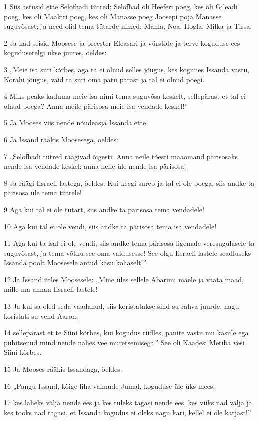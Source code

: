 \par 1 Siis astusid ette Selofhadi tütred; Selofhad oli Heeferi poeg, kes oli Gileadi poeg, kes oli Maakiri poeg, kes oli Manasse poeg Joosepi poja Manasse suguvõsast; ja need olid tema tütarde nimed: Mahla, Noa, Hogla, Milka ja Tirsa.
\par 2 Ja nad seisid Moosese ja preester Eleasari ja vürstide ja terve koguduse ees kogudusetelgi ukse juures, öeldes:
\par 3 „Meie isa suri kõrbes, aga ta ei olnud selles jõugus, kes kogunes Issanda vastu, Korahi jõugus, vaid ta suri oma patu pärast ja tal ei olnud poegi.
\par 4 Miks peaks kaduma meie isa nimi tema suguvõsa keskelt, sellepärast et tal ei olnud poega? Anna meile pärisosa meie isa vendade keskel!”
\par 5 Ja Mooses viis nende nõudeasja Issanda ette.
\par 6 Ja Issand rääkis Moosesega, öeldes:
\par 7 „Selofhadi tütred räägivad õigesti. Anna neile tõesti maaomand pärisosaks nende isa vendade keskel; anna neile üle nende isa pärisosa!
\par 8 Ja räägi Iisraeli lastega, öeldes: Kui keegi sureb ja tal ei ole poega, siis andke ta pärisosa üle tema tütrele!
\par 9 Aga kui tal ei ole tütart, siis andke ta pärisosa tema vendadele!
\par 10 Aga kui tal ei ole vendi, siis andke ta pärisosa tema isa vendadele!
\par 11 Aga kui ta isal ei ole vendi, siis andke tema pärisosa ligemale veresugulasele ta suguvõsast, ja tema võtku see oma valdusesse! See olgu Iisraeli lastele seadluseks Issanda poolt Moosesele antud käsu kohaselt!”
\par 12 Ja Issand ütles Moosesele: „Mine üles sellele Abarimi mäele ja vaata maad, mille ma annan Iisraeli lastele!
\par 13 Ja kui sa oled seda vaadanud, siis koristatakse sind su rahva juurde, nagu koristati su vend Aaron,
\par 14 sellepärast et te Siini kõrbes, kui kogudus riidles, panite vastu mu käsule ega pühitsenud mind nende nähes vee muretsemisega.” See oli Kaadesi Meriba vesi Siini kõrbes.
\par 15 Ja Mooses rääkis Issandaga, öeldes:
\par 16 „Pangu Issand, kõige liha vaimude Jumal, koguduse üle üks mees,
\par 17 kes läheks välja nende ees ja kes tuleks tagasi nende ees, kes viiks nad välja ja kes tooks nad tagasi, et Issanda kogudus ei oleks nagu kari, kellel ei ole karjast!”
